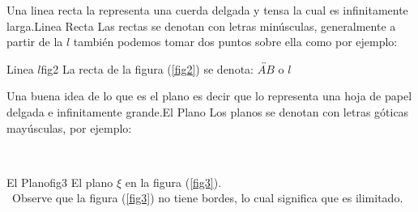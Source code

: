 \documentclass[12pt]{book}
\begin{document}
\begin{tndefinido}{Una linea recta la representa una cuerda delgada y tensa la cual es
infinitamente larga.}{Linea Recta}
Las rectas se denotan con letras min\'{u}sculas, generalmente a partir de la
$l$ tambi\'{e}n podemos tomar dos puntos sobre ella como por ejemplo:
\begin{figura}{
}{Linea $l$}{fig2}
La recta de la figura (\ref{fig2}) se denota: $\overleftrightarrow{AB}$ o $l$
\end{figura}
\end{tndefinido}
\begin{tndefinido}{Una buena idea de lo que es el plano es decir que lo representa una hoja de
papel delgada e infinitamente grande.}{El Plano}
 Los planos se denotan con letras g\'{o}ticas may\'{u}sculas, por ejemplo:
\vskip -40pt
\begin{figura}{
\\
}{El Plano}{fig3}
El plano $\xi$ en la figura (\ref{fig3}).\\ \nota \, Observe que la figura (\ref{fig3}) no tiene bordes,
 lo cual significa  que es ilimitado.
\end{figura}
\end{tndefinido}
\vspace*{20pt}
\end{document}
